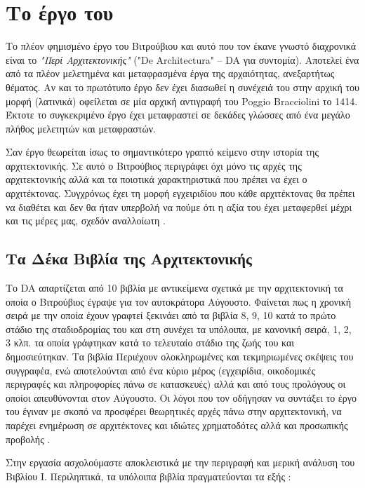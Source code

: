 \section{Το έργο του} 

Το πλέον φημισμένο έργο του Βιτρούβιου και αυτό που τον έκανε γνωστό διαχρονικά 
είναι το \emph{"Περί Αρχιτεκτονικής"} ("De Architectura" -- DA για συντομία). 
Αποτελεί ένα από τα πλέον μελετημένα και μεταφρασμένα έργα της αρχαιότητας, 
ανεξαρτήτως θέματος. Αν και το πρωτότυπο έργο δεν έχει διασωθεί η συνέχειά του 
στην αρχική του μορφή (λατινικά) οφείλεται σε μία αρχική αντιγραφή του Poggio 
Bracciolini το 1414. Έκτοτε το συγκεκριμένο έργο έχει μεταφραστεί σε δεκάδες 
γλώσσες από ένα μεγάλο πλήθος μελετητών και μεταφραστών.

Σαν έργο θεωρείται ίσως το σημαντικότερο γραπτό κείμενο στην ιστορία της αρχιτεκτονικής. Σε αυτό ο Βιτρούβιος περιγράφει όχι μόνο τις αρχές της αρχιτεκτονικής αλλά και τα ποιοτικά χαρακτηριστικά που πρέπει να έχει ο αρχιτέκτονας. Συγχρόνως έχει τη μορφή εγχειριδίου που κάθε αρχιτέκτονας θα πρέπει να διαθέτει και δεν θα ήταν υπερβολή να πούμε ότι η αξία του έχει μεταφερθεί μέχρι και τις μέρες μας, σχεδόν αναλλοίωτη \cite[σ. 16-18]{vitruvius-lefas}.

\subsection{Τα Δέκα Βιβλία της Αρχιτεκτονικής}

Το DA απαρτίζεται από 10 βιβλία με αντικείμενα σχετικά με την αρχιτεκτονική τα οποία ο Βιτρούβιος έγραψε για τον αυτοκράτορα Αύγουστο. Φαίνεται πως η χρονική σειρά με την οποία έχουν γραφτεί ξεκινάει από τα βιβλία 8, 9, 10 κατά το πρώτο στάδιο της σταδιοδρομίας του και στη συνέχει τα υπόλοιπα, με κανονική σειρά, 1, 2, 3 κλπ. τα οποία γράφτηκαν κατά το τελευταίο στάδιο της ζωής του και δημοσιεύτηκαν. Τα βιβλία Περιέχουν ολοκληρωμένες και τεκμηριωμένες σκέψεις του συγγραφέα, ενώ αποτελούνται από ένα κύριο μέρος (εγχειρίδια, οικοδομικές περιγραφές και πληροφορίες πάνω σε κατασκευές) αλλά και από τους προλόγους οι οποίοι απευθύνονται στον Αύγουστο. Οι λόγοι που τον οδήγησαν να συντάξει το έργο του έγιναν με σκοπό να προσφέρει θεωρητικές αρχές πάνω στην αρχιτεκτονική, να παρέχει ενημέρωση σε αρχιτέκτονες και ιδιώτες χρηματοδότες αλλά και προσωπικής προβολής \cite{vitruvius-lefas}.

Στην εργασία ασχολούμαστε αποκλειστικά με την περιγραφή και μερική ανάλυση του Bιβλίου I. Περιληπτικά, τα υπόλοιπα βιβλία πραγματεύονται τα εξής \cite{erismis_critical_2013}:

